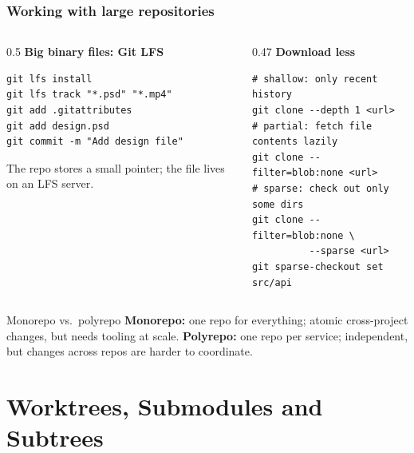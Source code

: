\documentclass[aspectratio=169,10pt,compress]{beamer}
\begin{document}
\begin{frame}[t,fragile] \frametitle{Working with large repositories}
  \begin{columns}[T]
    \begin{column}{0.5\textwidth}
      \textbf{Big binary files: Git LFS}
\begin{lstlisting}
git lfs install
git lfs track "*.psd" "*.mp4"
git add .gitattributes
git add design.psd
git commit -m "Add design file"
\end{lstlisting}
      \small The repo stores a small pointer; the file lives on an LFS server.
    \end{column}
    \begin{column}{0.47\textwidth}
      \textbf{Download less}
\begin{lstlisting}
# shallow: only recent history
git clone --depth 1 <url>
# partial: fetch file contents lazily
git clone --filter=blob:none <url>
# sparse: check out only some dirs
git clone --filter=blob:none \
          --sparse <url>
git sparse-checkout set src/api
\end{lstlisting}
    \end{column}
  \end{columns}

  \begin{block}{Monorepo vs.\ polyrepo}
    \small \textbf{Monorepo:} one repo for everything; atomic cross-project changes, but needs tooling at scale.
    \textbf{Polyrepo:} one repo per service; independent, but changes across repos are harder to coordinate.
  \end{block}
\end{frame}

\section[Worktrees]{Worktrees, Submodules and Subtrees}
\end{document}
